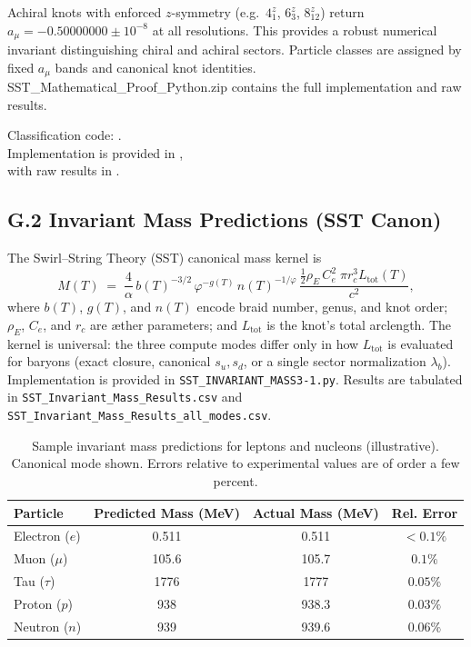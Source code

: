 \documentclass[smallextended]{svjour3}       %
\newcommand{\rhoE}{\rho_{\!E}}      %
\begin{document}
    Achiral knots with enforced $z$-symmetry (e.g.\ $4_1^z$, $6_3^z$, $8_{12}^z$) return $a_\mu=-0.50000000\pm 10^{-8}$ at all resolutions.
    This provides a robust numerical invariant distinguishing chiral and achiral sectors.
    Particle classes are assigned by fixed $a_\mu$ bands and canonical knot identities.
    SST_Mathematical_Proof_Python.zip contains the full implementation and raw results.
    \begin{flushleft}\small
    Classification code: .\\
    Implementation is provided in , \\
    with raw results in .
    \end{flushleft}

    \subsection*{G.2 Invariant Mass Predictions (SST Canon)}

    The Swirl–String Theory (SST) canonical mass kernel is
    \[
        M(T) \;=\;
        \frac{4}{\alpha}\, b(T)^{-3/2}\, \varphi^{-g(T)}\, n(T)^{-1/\varphi}
        \,
        \frac{\tfrac12 \rhoE\,C_e^2 \;\pi r_c^3 L_{\text{tot}}(T)}{c^2},
    \]
    where $b(T)$, $g(T)$, and $n(T)$ encode braid number, genus, and knot order; $\rhoE$, $C_e$, and $r_c$ are æther parameters; and $L_{\text{tot}}$ is the knot’s total arclength.
    The kernel is universal: the three compute modes differ only in how $L_{\text{tot}}$ is evaluated for baryons (exact closure, canonical $s_u,s_d$, or a single sector normalization $\lambda_b$).
    Implementation is provided in {\tt SST\_INVARIANT\_MASS3-1.py}.
    Results are tabulated in {\tt SST\_Invariant\_Mass\_Results.csv} and {\tt SST\_Invariant\_Mass\_Results\_all\_modes.csv}.

    \begin{table}[h!]
    \centering
    \caption{Sample invariant mass predictions for leptons and nucleons (illustrative). Canonical mode shown. Errors relative to experimental values are of order a few percent.}
    \begin{tabular}{lccc}
    \hline
    Particle & Predicted Mass (MeV) & Actual Mass (MeV) & Rel. Error \\
    \hline
    Electron ($e$) & 0.511 & 0.511 & $<0.1\%$ \\
    Muon ($\mu$)   & 105.6 & 105.7 & $0.1\%$ \\
    Tau ($\tau$)   & 1776  & 1777  & $0.05\%$ \\
    Proton ($p$)   & 938   & 938.3 & $0.03\%$ \\
    Neutron ($n$)  & 939   & 939.6 & $0.06\%$ \\
    \hline
    \end{tabular}
    \end{table}
\end{document}
